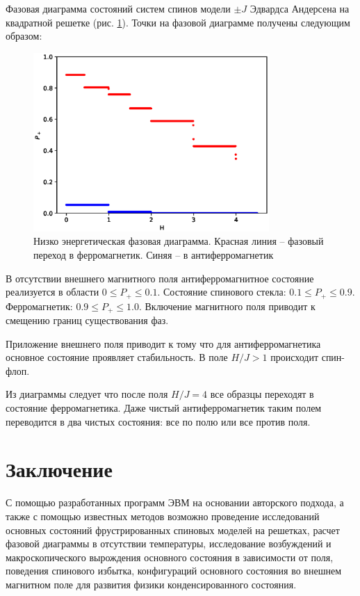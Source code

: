 \documentclass[utf8, babel, sor, jor, amsmath, amssymb, reprint]{elsarticle} %
\begin{document}
Фазовая диаграмма состояний систем спинов модели $\pm J$ Эдвардса Андерсена на квадратной решетке (рис. \ref{fig:P+_afm_fm(H)}). Точки на фазовой диаграмме получены следующим образом:

\begin{figure}[H]
	\centering
	\includegraphics[width=0.8\textwidth]{images/P+_afm_fm(H).eps}
	\caption{Низко энергетическая фазовая диаграмма. Красная линия -- фазовый переход в ферромагнетик. Синяя -- в антиферромагнетик}
	\label{fig:P+_afm_fm(H)}
\end{figure}

В отсутствии внешнего магнитного поля антиферромагнитное состояние реализуется в области $0 \leq P_+ \leq 0.1$. Состояние спинового стекла: $0.1 \leq P_+ \leq 0.9$. Ферромагнетик: $0.9 \leq P_+ \leq 1.0$. Включение магнитного поля приводит к смещению границ существования фаз.

Приложение внешнего поля приводит к тому что для антиферромагнетика основное состояние проявляет стабильность. В поле $H/J > 1$ происходит спин-флоп.

Из диаграммы следует что после поля $H/J = 4$ все образцы переходят в состояние ферромагнетика. Даже чистый антиферромагнетик таким полем переводится в два чистых состояния: все по полю или все против поля.

\section{Заключение}

С помощью разработанных программ ЭВМ на основании авторского подхода, а также с помощью известных методов возможно проведение исследований основных состояний фрустрированных спиновых моделей на решетках, расчет фазовой диаграммы в отсутствии температуры, исследование возбуждений и макроскопического вырождения основного состояния в зависимости от поля, поведения спинового избытка, конфигураций основного состояния во внешнем магнитном поле для развития физики конденсированного состояния.
\end{document}
